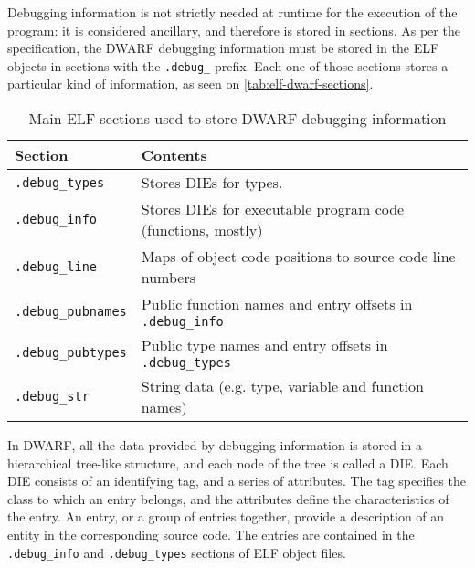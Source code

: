 Debugging information is not strictly needed at runtime for the execution of
the program: it is considered ancillary, and therefore is stored in sections.
As per the specification, the DWARF debugging information must be stored in
the ELF objects in sections with the \verb|.debug_| prefix. Each one of those
sections stores a particular kind of information, as seen on
\autoref{tab:elf-dwarf-sections}.

\begin{table}
  \centering\small
  \begin{tabular}{lp{}}
    \toprule
    Section & Contents \\
    \midrule
    \verb|.debug_types| & Stores DIEs for types. \\
    \verb|.debug_info| & Stores DIEs for executable program code (functions, mostly) \\
    \verb|.debug_line| & Maps of object code positions to source code line numbers \\
    \verb|.debug_pubnames| & Public function names and entry offsets in \verb|.debug_info| \\
    \verb|.debug_pubtypes| & Public type names and entry offsets in \verb|.debug_types| \\
    \verb|.debug_str| & String data (e.g. type, variable and function names) \\
    \bottomrule
  \end{tabular}
  \caption{Main ELF sections used to store DWARF debugging information}
  \label{tab:elf-dwarf-sections}
\end{table}


In \gls{DWARF}, all the data provided by debugging information is stored in
a hierarchical tree-like structure, and each node of the tree is called
a \gls{DIE}. Each DIE consists of an identifying tag, and a series of
attributes. The tag specifies the class to which an entry belongs, and the
attributes define the characteristics of the entry. An entry, or a group of
entries together, provide a description of an entity in the corresponding
source code. The entries are contained in the \verb|.debug_info| and
\verb|.debug_types| sections of ELF object files.


